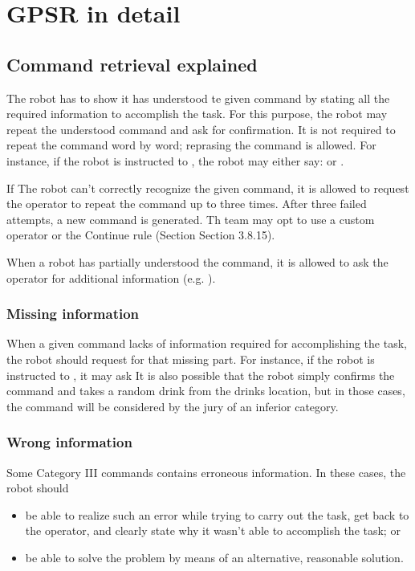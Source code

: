 \chapter{GPSR in detail}
\label{chap:gpsr-appendix}

\section{Command retrieval explained}
The robot has to show it has understood te given command by stating all the required information to accomplish the task. For this purpose, the robot may repeat the understood command and ask for confirmation. It is not required to repeat the command word by word; reprasing the command is allowed. For instance, if the robot is instructed to , the robot may either say: \textit{} or \textit{}.

If The robot can't correctly recognize the given command, it is allowed to request the operator to repeat the command up to three times. After three failed attempts, a new command is generated. Th team may opt to use a custom operator or the Continue rule (Section Section 3.8.15).

When a robot has partially understood the command, it is allowed to ask the operator for additional information (e.g. \textit{}).

\subsection{Missing information}
When a given command lacks of information required for accomplishing the task, the robot should request for that missing part. For instance, if the robot is instructed to \textit{}, it may ask \textit{} It is also possible that the robot simply confirms the command and takes a random drink from the drinks location, but in those cases, the command will be considered by the jury of an inferior category.

\subsection{Wrong information}
Some Category III commands contains erroneous information. In these cases, the robot should
\begin{itemize}
	\item be able to realize such an error while trying to carry out the task, get back to the operator, and clearly state why it wasn't able to accomplish the task; or
	\item be able to solve the problem by means of an alternative, reasonable solution.
\end{itemize}

